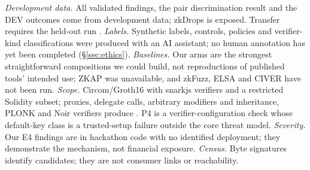 \emph{Development data.} All validated findings, the pair discrimination
result and the DEV outcomes come from development data; zkDrops is exposed.
Transfer requires the held-out run
.
\emph{Labels.} Synthetic labels, controls, policies and verifier-kind
classifications were produced with an AI assistant; no human annotation has
yet been completed (\S\ref{sec:ethics}).
\emph{Baselines.} Our arms are the strongest straightforward compositions we
could build, not reproductions of published tools' intended use; ZKAP was
unavailable, and zkFuzz, ELSA and CIVER have not been run.
\emph{Scope.} Circom/Groth16 with snarkjs verifiers and a restricted Solidity
subset; proxies, delegate calls, arbitrary modifiers and inheritance, PLONK
and Noir verifiers produce \UNK{}. P4 is a verifier-configuration check whose
default-key class is a trusted-setup failure outside the core threat model.
\emph{Severity.} Our E4 findings are in hackathon code with no identified
deployment; they demonstrate the mechanism, not financial exposure.%
\emph{Census.} Byte signatures identify candidates; they are not consumer
links or reachability.
